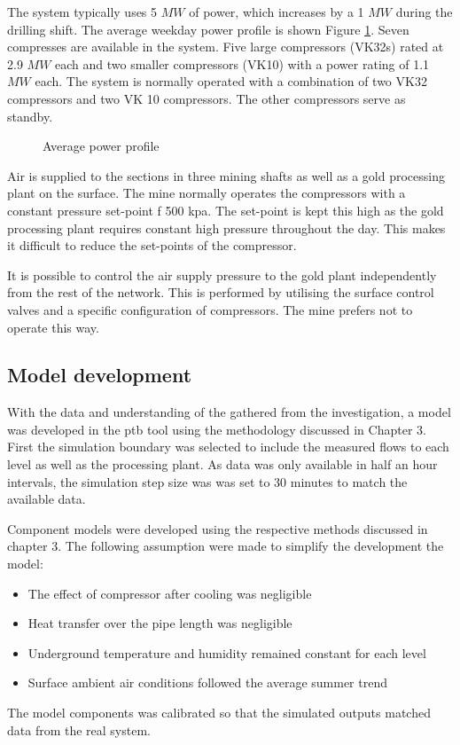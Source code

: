 The system typically uses 5 $MW$ of power, which increases by a 1 $MW$ during the drilling shift. The average weekday power profile is shown Figure \ref{fig: Beatrix power baseline}. Seven compresses are available in the system. Five large compressors (VK32s) rated at 2.9 $MW$ each and two smaller compressors (VK10) with a power rating of 1.1 $MW$ each. The system is normally operated with a combination of two VK32 compressors and two VK 10 compressors. The other compressors serve as standby. 
\begin{figure}[h!]
	\centering
	
	\caption{Average power profile}
	\label{fig: Beatrix power baseline}
\end{figure}

\par
Air is supplied to the sections in three mining shafts as well as a gold processing plant on the surface.  The mine normally operates the compressors with a constant pressure set-point f 500 \gls{kpa}.  The set-point is  kept this high as the gold processing plant requires constant high pressure throughout the day. This makes it difficult to reduce the set-points of the compressor.
\par
 It is possible to control the air supply pressure to the gold plant independently from the rest of the network. This is performed by utilising the surface control valves and a specific configuration of compressors. The mine prefers not to operate this way.
\subsection{Model development}
With the data and understanding of the gathered from the investigation, a model was developed in the \gls{ptb} tool using the methodology discussed in Chapter 3. First the simulation boundary was selected to include the measured flows to each level as well as the processing plant. As data was only available in half an hour intervals, the simulation step size was was set to 30 minutes to match the available data.
\par
Component models were developed using the respective methods discussed in chapter 3. The following assumption were  made to simplify the development the model:
\begin{itemize}
	\item The effect of compressor after cooling was negligible
	\item Heat transfer over the pipe length was negligible
	\item Underground temperature and humidity remained constant for each level
	\item Surface ambient air conditions followed the average summer trend
\end{itemize} 
The model components was calibrated so that the simulated outputs matched data from the real system.
